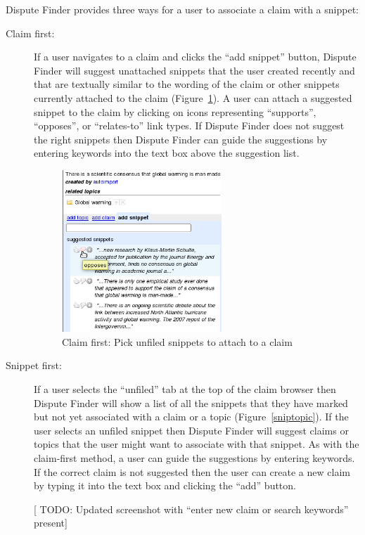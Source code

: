 \documentclass{www2010-submission}
\newcommand{\todo}[1]{{[\color{blue} TODO: #1]}}
\begin{document}
Dispute Finder provides three ways for a user to associate a claim with a snippet:

\begin{description}
\item[Claim first:] If a user navigates to a claim and clicks the ``add snippet'' button, Dispute Finder will suggest unattached snippets that the user created recently and that are textually similar to the wording of the claim or other snippets currently attached to the claim (Figure~\ref{snipclaim}). A user can attach a suggested snippet to the claim by clicking on icons representing ``supports'', ``opposes'', or ``relates-to'' link types. If Dispute Finder does not suggest the right snippets then Dispute Finder can guide the suggestions by entering keywords into the text box above the suggestion list.

\begin{figure}[tb]
	\begin{center}
	\includegraphics[width=6cm]{../screenshots/v2_sugsnippet.png}
	\caption{Claim first: Pick unfiled snippets to attach to a claim}
	\label{snipclaim}
	\end{center}
\end{figure}

\item[Snippet first:] If a user selects the ``unfiled'' tab at the top of the claim browser then Dispute Finder will show a list of all the snippets that they have marked but not yet associated with a claim or a topic (Figure~\ref{sniptopic}). If the user selects an unfiled snippet then Dispute Finder will suggest claims or topics that the user might want to associate with that snippet. As with the claim-first method, a user can guide the suggestions by entering keywords. If the correct claim is not suggested then the user can create a new claim by typing it into the text box and clicking the ``add'' button.

\todo{Updated screenshot with ``enter new claim or search keywords'' present}


\end{description}
\end{document}
